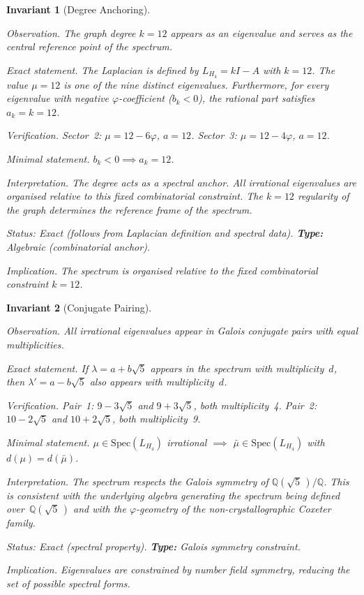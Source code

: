\documentclass[12pt,a4paper]{article}
\newcommand{\vphi}{\varphi}
\newcommand{\Lmat}{L_{H_4}}
\newcommand{\Q}{\mathbb{Q}}
\newtheorem{invariant}{Invariant}
\begin{document}
\begin{invariant}[Degree Anchoring]\label{inv:degree}

\emph{Observation.}
The graph degree $k = 12$ appears as an eigenvalue and serves as the
central reference point of the spectrum.

\emph{Exact statement.}
The Laplacian is defined by $\Lmat = kI - A$ with $k = 12$.  The
value $\mu = 12$ is one of the nine distinct eigenvalues.  Furthermore,
for every eigenvalue with negative $\vphi$-coefficient ($b_k < 0$),
the rational part satisfies $a_k = k = 12$.

\emph{Verification.}
Sector~2: $\mu = 12 - 6\vphi$, $a = 12$.
Sector~3: $\mu = 12 - 4\vphi$, $a = 12$.

\emph{Minimal statement.}
$b_k < 0 \implies a_k = 12$.

\emph{Interpretation.}
The degree acts as a spectral anchor.  All irrational eigenvalues
are organised relative to this fixed combinatorial constraint.  The
$k = 12$ regularity of the graph determines the reference frame of
the spectrum.

\emph{Status:} Exact (follows from Laplacian definition and spectral
data). \quad \textbf{Type:} Algebraic (combinatorial anchor).

\emph{Implication.}
The spectrum is organised relative to the fixed combinatorial
constraint $k = 12$.
\end{invariant}

\begin{invariant}[Conjugate Pairing]\label{inv:conj}

\emph{Observation.}
All irrational eigenvalues appear in Galois conjugate pairs with equal
multiplicities.

\emph{Exact statement.}
If $\lambda = a + b\sqrt{5}$ appears in the spectrum with
multiplicity~$d$, then $\lambda' = a - b\sqrt{5}$ also appears with
multiplicity~$d$.

\emph{Verification.}
Pair~1: $9 - 3\sqrt{5}$ and $9 + 3\sqrt{5}$, both multiplicity~4.
Pair~2: $10 - 2\sqrt{5}$ and $10 + 2\sqrt{5}$, both multiplicity~9.

\emph{Minimal statement.}
$\mu \in \mathrm{Spec}(\Lmat)$ irrational $\implies$
$\bar\mu \in \mathrm{Spec}(\Lmat)$ with $d(\mu) = d(\bar\mu)$.

\emph{Interpretation.}
The spectrum respects the Galois symmetry of
$\Q(\sqrt{5}\,)/\Q$.  This is consistent with the underlying algebra
generating the spectrum being defined over~$\Q(\sqrt{5}\,)$ and
with the $\vphi$-geometry of the non-crystallographic Coxeter family.

\emph{Status:} Exact (spectral property). \quad
\textbf{Type:} Galois symmetry constraint.

\emph{Implication.}
Eigenvalues are constrained by number field symmetry, reducing the
set of possible spectral forms.
\end{invariant}
\end{document}
